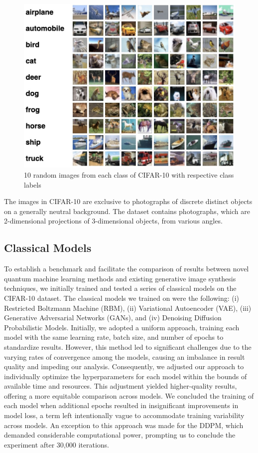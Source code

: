 \documentclass[%
 reprint,
 amsmath,amssymb,
 aps,
]{revtex4-2}
\begin{document}
\begin{figure}[h]
    \includegraphics[width=0.9\columnwidth]{cifar10.jpeg}
    \caption{\label{fig:cifar10} 10 random images from each class of CIFAR-10 with respective class labels \cite{CIFAR}}
\end{figure}


The images in CIFAR-10 are exclusive to photographs of discrete distinct objects on a generally neutral background. The dataset contains photographs, which are 2-dimensional projections of 3-dimensional objects, from various angles.

\subsection{Classical Models}

To establish a benchmark and facilitate the comparison of results between novel quantum machine learning methods and existing generative image synthesis techniques, we initially trained and tested a series of classical models on the CIFAR-10 dataset. The classical models we trained on were the following: (i) Restricted Boltzmann Machine (RBM), (ii) Variational Autoencoder (VAE), (iii) Generative Adversarial Networks (GANs), and (iv) Denoising Diffusion Probabilistic Models. Initially, we adopted a uniform approach, training each model with the same learning rate, batch size, and number of epochs to standardize results. However, this method led to significant challenges due to the varying rates of convergence among the models, causing an imbalance in result quality and impeding our analysis. Consequently, we adjusted our approach to individually optimize the hyperparameters for each model within the bounds of available time and resources. This adjustment yielded higher-quality results, offering a more equitable comparison across models. We concluded the training of each model when additional epochs resulted in insignificant improvements in model loss, a term left intentionally vague to accommodate training variability across models. An exception to this approach was made for the DDPM, which demanded considerable computational power, prompting us to conclude the experiment after 30,000 iterations.
\end{document}
